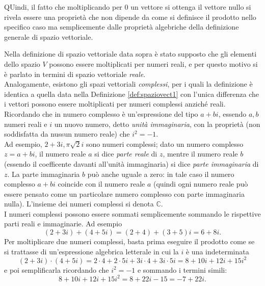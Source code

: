 QUindi, il fatto che moltiplicando per 0 un vettore si ottenga il vettore nullo si rivela essere una proprietà che non dipende da come si definisce il prodotto nello specifico caso ma semplicemente dalle proprietà algebriche della definizione generale di spazio vettoriale.
\begin{oss}
  \label{oss:spaziovect2}
  Nella definizione di spazio vettoriale data sopra è stato supposto che gli elementi dello spazio $V$ possono essere moltiplicati per numeri reali, e per questo motivo si è parlato in termini di spazio vettoriale \textit{reale}.\\
  Analogamente, esistono gli spazi vettoriali \textit{complessi}, per i quali la definizione è identica a quella data nella Definizione \ref{def:spaziovect1} con l'unica differenza che i vettori possono essere moltiplicati per numeri complessi anziché reali.\\
  Ricordando che in numero complesso è un'espressione del tipo $a+bi$, essendo $a,b$ numeri reali e $i$ un nuovo numero, detto \textit{unità immaginaria}, con la proprietà (non soddisfatta da nussun numero reale) che $i^2=-1$.\\
  Ad esempio, $2+3i,\pi\sqrt{2}i$ sono numeri complessi; dato un numero complesso $z=a+bi$, il numero reale $a$ si dice \textit{parte reale} di $z$, mentre il numero reale $b$ (essendo il coefficente davanti all'unità immaginaria) si dice \textit{parte immaginaria} di $z$. La parte immaginaria $b$ può anche uguale a zero: in tale caso il numero complesso $a+bi$ coincide con il numero reale $a$ (quindi ogni numero reale può essere pensato come un particolare numero complesso con parte immaginaria nulla). L'insieme dei numeri complessi si denota $\mathds{C}$.\\
  I numeri complessi possono essere sommati semplicemente sommando le rispettive parti reali e immaginarie. Ad esempio
  \begin{equation*}
    (2+3i)+(4+5i)=(2+4)+(3+5)i=6+8i.
  \end{equation*}
  Per moltiplicare due numeri complessi, basta prima eseguire il prodotto come se si trattasse di un'espressione algebrica letterale in cui la $i$ è una indeterminata
  \begin{equation*}
    (2+3i)\cdot (4+5i)=2\cdot 4+2\cdot 5i+3i\cdot 4+3i\cdot 5i= 8+10i+12i+15i^2
  \end{equation*}
  e poi semplificarla ricordando che $i^2=-1$ e sommando i termini simili:
  \begin{equation*}
    8+10i+12i+15i^2=8+22i-15=-7+22i.

\end{equation*}
\end{oss}
